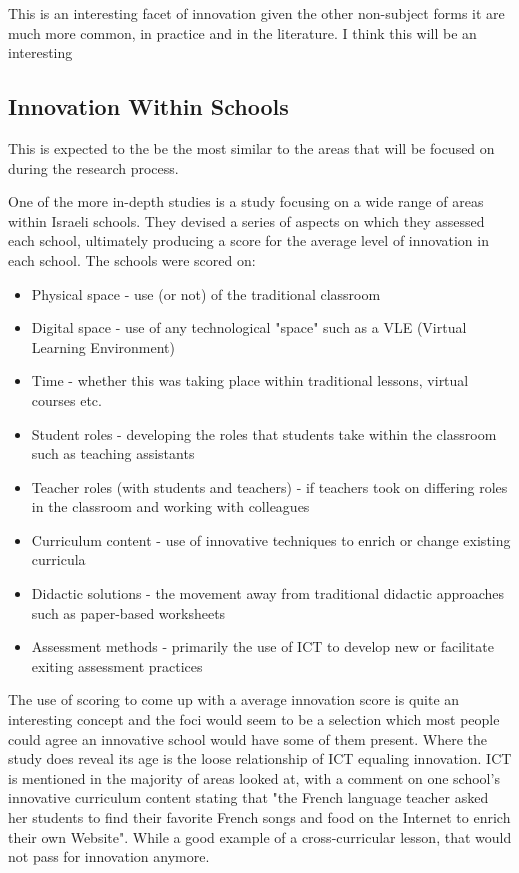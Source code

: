 This is an interesting facet of innovation given the other non-subject forms it are much more common, in practice and in the literature. I think this will be an interesting 

\subsection{Innovation Within Schools}
This is expected to the be the most similar to the areas that will be focused on during the research process.

One of the more in-depth studies is a study focusing on a wide range of areas within Israeli schools. \cite{tubin2003domains} They devised a series of aspects on which they assessed each school, ultimately producing a score for the average level of innovation in each school. The schools were scored on:

\begin{itemize}
\item Physical space - use (or not) of the traditional classroom
\item Digital space - use of any technological "space" such as a VLE (Virtual Learning Environment)
\item Time - whether this was taking place within traditional lessons, virtual courses etc.
\item Student roles - developing the roles that students take within the classroom such as teaching assistants
\item Teacher roles (with students and teachers) - if teachers took on differing roles in the classroom and working with colleagues
\item Curriculum content - use of innovative techniques to enrich or change existing curricula
\item Didactic solutions - the movement away from traditional didactic approaches such as paper-based worksheets
\item Assessment methods - primarily the use of ICT to develop new or facilitate exiting assessment practices
\end{itemize}

The use of scoring to come up with a average innovation score is quite an interesting concept and the foci would seem to be a selection which most people could agree an innovative school would have some of them present. Where the study does reveal its age is the loose relationship of ICT equaling innovation. ICT is mentioned in the majority of areas looked at, with a comment on one school's innovative curriculum content stating that "the French language teacher asked her students to find their favorite French songs and food on the Internet to enrich their own Website". While a good example of a cross-curricular lesson, that would not pass for innovation anymore.

